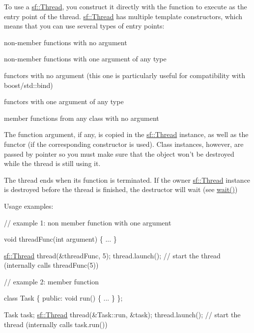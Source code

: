 To use a \hyperlink{classsf_1_1_thread}{sf\-::\-Thread}, you construct it directly with the function to execute as the entry point of the thread. \hyperlink{classsf_1_1_thread}{sf\-::\-Thread} has multiple template constructors, which means that you can use several types of entry points\-: \begin{DoxyItemize}
\item non-\/member functions with no argument \item non-\/member functions with one argument of any type \item functors with no argument (this one is particularly useful for compatibility with boost/std\-:\-:bind) \item functors with one argument of any type \item member functions from any class with no argument\end{DoxyItemize}
The function argument, if any, is copied in the \hyperlink{classsf_1_1_thread}{sf\-::\-Thread} instance, as well as the functor (if the corresponding constructor is used). Class instances, however, are passed by pointer so you must make sure that the object won't be destroyed while the thread is still using it.

The thread ends when its function is terminated. If the owner \hyperlink{classsf_1_1_thread}{sf\-::\-Thread} instance is destroyed before the thread is finished, the destructor will wait (see \hyperlink{classsf_1_1_thread_a724b1f94c2d54f84280f2f78bde95fa0}{wait()})

Usage examples\-: 
\begin{DoxyCode}
\textcolor{comment}{// example 1: non member function with one argument}

\textcolor{keywordtype}{void} threadFunc(\textcolor{keywordtype}{int} argument)
\{
    ...
\}

\hyperlink{classsf_1_1_thread}{sf::Thread} thread(&threadFunc, 5);
thread.launch(); \textcolor{comment}{// start the thread (internally calls threadFunc(5))}
\end{DoxyCode}



\begin{DoxyCode}
\textcolor{comment}{// example 2: member function}

\textcolor{keyword}{class }Task
\{
\textcolor{keyword}{public}:
    \textcolor{keywordtype}{void} run()
    \{
        ...
    \}
\};

Task task;
\hyperlink{classsf_1_1_thread}{sf::Thread} thread(&Task::run, &task);
thread.launch(); \textcolor{comment}{// start the thread (internally calls task.run())}
\end{DoxyCode}



